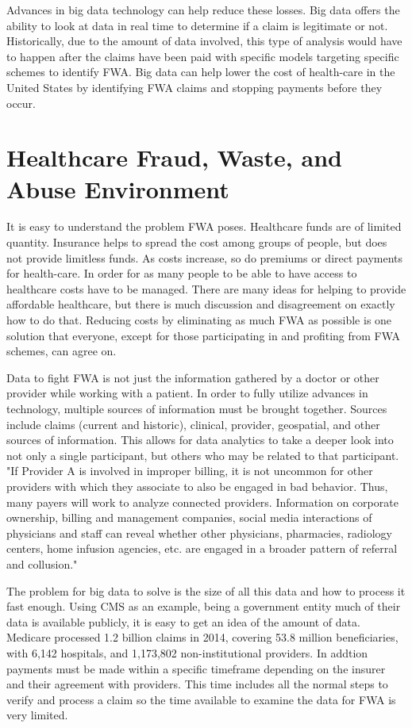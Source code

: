 \documentclass[sigconf]{acmart}
\begin{document}
Advances in big data technology can help reduce these losses.  Big data offers the 
ability to look at data in real time to determine if a claim is legitimate or not.  
Historically, due to the amount of data involved, this type of analysis would have to 
happen after the claims have been paid with specific models targeting specific 
schemes to identify FWA.  Big data can help lower the cost of health-care in the 
United States by identifying FWA claims and stopping payments before they occur. 


\section{Healthcare Fraud, Waste, and Abuse Environment}

It is easy to understand the problem FWA poses.  Healthcare funds are of limited 
quantity.  Insurance helps to spread the cost among groups of people, but does not 
provide limitless funds.  As costs increase, so do premiums or direct payments for 
health-care.  In order for as many people to be able to have access to healthcare 
costs have to be managed.  There are many ideas for helping to provide affordable 
healthcare, but there is much discussion and disagreement on exactly how to do that.  
Reducing costs by eliminating as much FWA as possible is one solution that everyone, 
except for those participating in and profiting from FWA schemes, can agree on.

Data to fight FWA is not just the information gathered by a doctor or other provider 
while working with a patient.  In order to fully utilize advances in technology, 
multiple sources of information must be brought together.  Sources include claims 
(current and historic), clinical, provider, geospatial, and other sources of 
information.  This allows for data analytics to take a deeper look into not only a 
single participant, but others who may be related to that participant.  "If Provider 
A is involved in improper billing, it is not uncommon for other providers with which 
they associate to also be engaged in bad behavior.  Thus, many payers will work to 
analyze connected providers.  Information on corporate ownership, billing and 
management companies, social media interactions of physicians and staff can reveal 
whether other physicians, pharmacies, radiology centers, home infusion agencies, etc. 
are engaged in a broader pattern of referral and collusion."\cite{RevCycle}

The problem for big data to solve is the size of all this data and how to process it 
fast enough.  Using CMS as an example, being a government entity much of their data is 
available publicly, it is easy to get an idea of the amount of data.  Medicare processed 
1.2 billion claims in 2014, covering 53.8 million beneficiaries, with 6,142  
hospitals, and 1,173,802 non-institutional providers\cite{2015CMSStatistics}.  In addtion
payments must be made within a specific timeframe depending on the insurer and their 
agreement with providers.  This time includes all the normal steps to verify and process 
a claim so the time available to examine the data for FWA is very limited.
\end{document}
